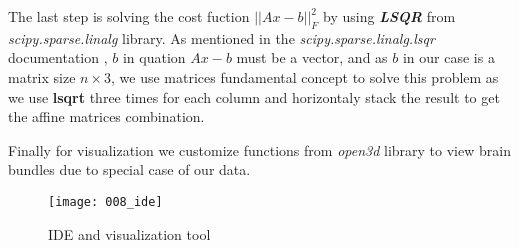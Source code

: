 \documentclass[../structure.tex]{subfiles}
\begin{document}
The last step is solving the cost fuction $||Ax-b||_{F}^2$ by using \textbf{\textit{LSQR}} from \textit{scipy.sparse.linalg} library. As mentioned in the \textit{scipy.sparse.linalg.lsqr} documentation \cite{Jones2001}, $b$ in quation $Ax-b$ must be a vector, and as $b$ in our case is a matrix size $n\times 3$, we use matrices fundamental concept to solve this problem as we use \textbf{lsqrt} three times for each column and horizontaly stack the result to get the affine matrices combination.

Finally for visualization we customize functions from \textit{open3d} library to view brain bundles due to special case of our data.

\begin{figure}[h!]
\centering
\texttt{[image: 008\_ide]}
\captionsetup{justification=centering}
\caption{IDE and visualization tool}
\end{figure}
\end{document}
